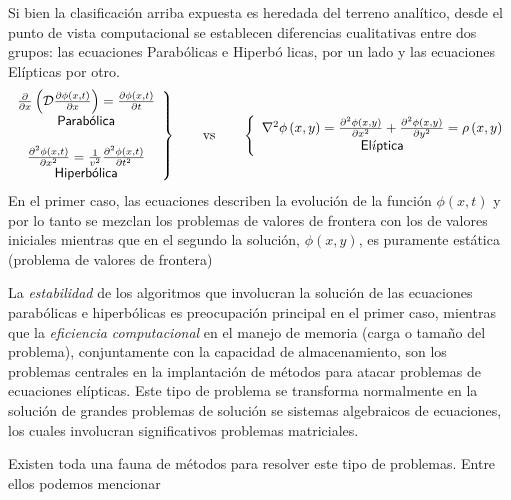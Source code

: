 \documentclass[spanish,titlepage,11pt]{article}
\begin{document}
Si bien la clasificaci\'{o}n arriba expuesta es heredada del terreno
anal\'{i}tico, desde el punto de vista computacional se establecen diferencias
cualitativas entre dos grupos: las ecuaciones Parab\'{o}licas e Hiperb\'{o}%
licas, por un lado y las ecuaciones El\'{i}pticas por otro.
\[
\left.
\begin{array}
[c]{c}%
\frac{\partial}{\partial x}\left(  \mathcal{D}\frac{\partial\phi\left(
x,t\right)  }{\partial x}\right)  =\frac{\partial\phi\left(  x,t\right)
}{\partial t}\\
\mathsf{Parab\acute{o}lica}\\
\\
\frac{\partial^{2}\phi\left(  x,t\right)  }{\partial x^{2}}=\frac{1}{v^{2}%
}\frac{\partial^{2}\phi\left(  x,t\right)  }{\partial t^{2}}\\
\mathsf{Hiperb\acute{o}lica}%
\end{array}
\right\}  \qquad\mathrm{vs\qquad}\left\{
\begin{array}
[c]{c}%
\nabla^{2}\phi\left(  x,y\right)  =\frac{\partial^{2}\phi\left(  x,y\right)
}{\partial x^{2}}+\frac{\partial^{2}\phi\left(  x,y\right)  }{\partial y^{2}%
}=\rho\left(  x,y\right) \\
\mathsf{El\acute{\imath}ptica}%
\end{array}
\right.
\]
En el primer caso, las ecuaciones describen la evoluci\'{o}n de la funci\'{o}n
$\phi\left(  x,t\right)  $ y por lo tanto se mezclan los problemas de valores
de frontera con los de valores iniciales mientras que en el segundo la
soluci\'{o}n, $\phi\left(  x,y\right)  $, es puramente est\'{a}tica (problema
de valores de frontera)

La \textit{estabilidad} de los algoritmos que involucran la soluci\'{o}n de
las ecuaciones parab\'{o}licas e hiperb\'{o}licas es preocupaci\'{o}n
principal en el primer caso, mientras que la \textit{eficiencia computacional}
en el manejo de memoria (carga o tama\~{n}o del problema), conjuntamente con
la capacidad de almacenamiento, son los problemas centrales en la
implantaci\'{o}n de m\'{e}todos para atacar problemas de ecuaciones
el\'{i}pticas. Este tipo de problema se transforma normalmente en la
soluci\'{o}n de grandes problemas de soluci\'{o}n se sistemas algebraicos de
ecuaciones, los cuales involucran significativos problemas matriciales.

Existen toda una fauna de m\'{e}todos para resolver este tipo de problemas.
Entre ellos podemos mencionar
\end{document}

